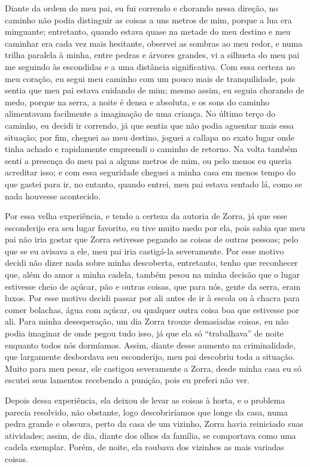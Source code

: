 Diante da ordem do meu pai, eu fui correndo e chorando nessa direção, no caminho não podia distinguir as coisas a uns metros de mim, porque a lua era minguante; entretanto, quando estava quase na metade do meu destino e meu caminhar era cada vez mais hesitante, observei as sombras ao meu redor, e numa trilha paralela à minha, entre pedras e árvores grandes, vi a silhueta do meu pai me seguindo às escondidas e a uma distância significativa.
Com essa certeza no meu coração, eu segui meu caminho com um pouco mais de tranquilidade, pois sentia que meu pai estava cuidando de mim; mesmo assim, eu seguia chorando de medo, porque na serra, a noite é densa e absoluta, e os sons do caminho alimentavam facilmente a imaginação de uma criança.
No último terço do caminho, eu decidi ir correndo, já que sentia que não podia aguentar mais essa situação; por fim, cheguei ao meu destino, joguei a callapa no exato lugar onde tinha achado e rapidamente empreendi o caminho de retorno.
Na volta também senti a presença do meu pai a alguns metros de mim, ou pelo menos eu queria acreditar isso; e com essa seguridade cheguei a minha casa em menos tempo do que gastei para ir, no entanto, quando entrei, meu pai estava sentado lá, como se nada houvesse acontecido.


Por essa velha experiência, e tendo a certeza da autoria de Zorra, já que esse esconderijo era seu lugar favorito, eu tive muito medo por ela, pois sabia que meu pai não iria gostar que Zorra estivesse pegando as coisas de outras pessoas; pelo que se eu avisava a ele, meu pai iria castigá-la severamente. Por esse motivo decidi não dizer nada sobre minha descoberta, entretanto, tenho que reconhecer que, além do amor a minha cadela, também pesou na minha decisão que o lugar estivesse cheio de açúcar, pão e outras coisas, que para nós, gente da serra, eram luxos. 
Por esse motivo decidi passar por ali antes de ir à escola ou à chacra para comer bolachas, água com açúcar, ou qualquer outra coisa boa que estivesse por ali. 
Para minha desesperação, um dia Zorra trouxe demasiadas coisas, eu  não podia imaginar de onde pegou tudo isso, já que ela só ``trabalhava'' de noite enquanto todos nós dormíamos. Assim, diante desse aumento na criminalidade, que largamente desbordava seu esconderijo, meu pai descobriu toda a situação.
Muito para meu pesar, ele castigou severamente a Zorra, desde minha casa eu só escutei seus lamentos recebendo a punição, pois eu preferi não ver.


Depois dessa experiência, ela deixou de  levar as coisas à horta, e o problema parecia resolvido, não obstante, logo descobriríamos que longe da casa, numa pedra grande e obscura, perto da casa de um vizinho, 
Zorra havia reiniciado suas atividades; assim, de dia, diante dos olhos da família, se comportava como uma cadela exemplar. Porém, de noite, ela roubava dos vizinhos as mais variadas coisas.

